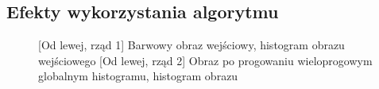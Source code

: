 \documentclass[a4paper,12pt, titlepage]{report}
\begin{document}
\subsection*{Efekty wykorzystania algorytmu}
\begin{figure}[h]
    \centering
    \qquad
    \caption{[Od lewej, rząd 1] Barwowy obraz wejściowy, histogram obrazu wejściowego [Od lewej, rząd 2] Obraz po progowaniu wieloprogowym globalnym histogramu, histogram obrazu}%
    \label{fig:rysunek}%
\end{figure}
\end{document}
